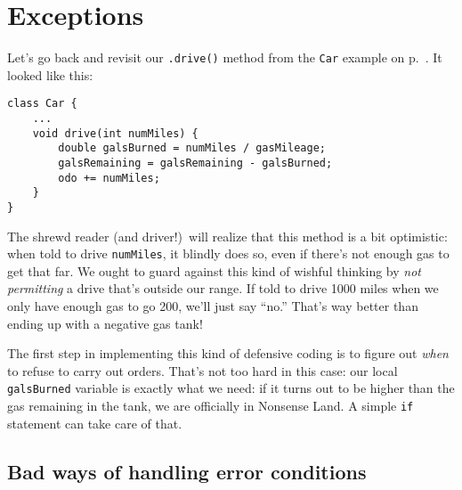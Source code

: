 
\chapter{Exceptions}
\label{ch:exceptions}


Let's go back and revisit our \texttt{.drive()} method from the \texttt{Car}
example on p.~\pageref{fig:carClassCodePreExceptions}. It looked like this:

\vspace{-.2in}
\begin{Verbatim}[fontsize=\footnotesize,samepage=true,frame=single]
class Car {
    ...
    void drive(int numMiles) {
        double galsBurned = numMiles / gasMileage;
        galsRemaining = galsRemaining - galsBurned;
        odo += numMiles;
    }
}
\end{Verbatim}
\vspace{-.2in}

The shrewd reader (and driver!)~will realize that this method is a bit
optimistic: when told to drive \texttt{numMiles}, it blindly does so, even if
there's not enough gas to get that far. We ought to guard against this kind of
wishful thinking by \textit{not permitting} a drive that's outside our range.
If told to drive 1000 miles when we only have enough gas to go 200, we'll just
say ``no.'' That's way better than ending up with a negative gas tank!

The first step in implementing this kind of defensive coding is to figure out
\textit{when} to refuse to carry out orders. That's not too hard in this case:
our local \texttt{galsBurned} variable is exactly what we need: if it turns
out to be higher than the gas remaining in the tank, we are officially in
Nonsense Land. A simple \texttt{if} statement can take care of that.

\section{Bad ways of handling error conditions}

